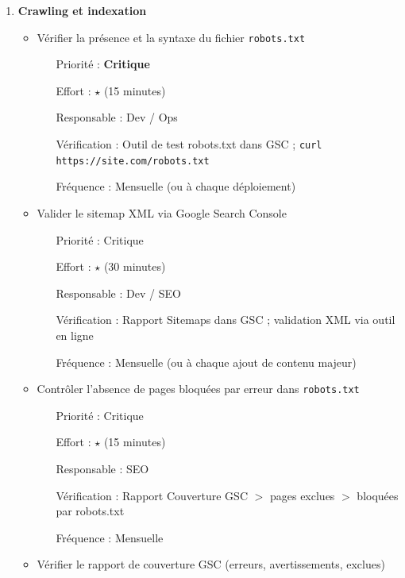 \documentclass[12pt,a4paper,twoside]{report}
\newcommand{\important}[1]{\textbf{\textcolor{googlered}{#1}}}
\begin{document}
\begin{enumerate}
    \item \textbf{Crawling et indexation}
    \begin{itemize}
        \item Vérifier la présence et la syntaxe du fichier \texttt{robots.txt}
        \begin{itemize}
            \item[Priorité :] \important{Critique}
            \item[Effort :] $\star$ (15 minutes)
            \item[Responsable :] Dev / Ops
            \item[Vérification :] Outil de test robots.txt dans GSC ; \texttt{curl https://site.com/robots.txt}
            \item[Fréquence :] Mensuelle (ou à chaque déploiement)
        \end{itemize}
        \item Valider le sitemap XML via Google Search Console
        \begin{itemize}
            \item[Priorité :] Critique
            \item[Effort :] $\star$ (30 minutes)
            \item[Responsable :] Dev / SEO
            \item[Vérification :] Rapport Sitemaps dans GSC ; validation XML via outil en ligne
            \item[Fréquence :] Mensuelle (ou à chaque ajout de contenu majeur)
        \end{itemize}
        \item Contrôler l'absence de pages bloquées par erreur dans \texttt{robots.txt}
        \begin{itemize}
            \item[Priorité :] Critique
            \item[Effort :] $\star$ (15 minutes)
            \item[Responsable :] SEO
            \item[Vérification :] Rapport Couverture GSC $>$ pages exclues $>$ bloquées par robots.txt
            \item[Fréquence :] Mensuelle
        \end{itemize}
        \item Vérifier le rapport de couverture GSC (erreurs, avertissements, exclues)
        \begin{itemize}

\end{itemize}
\end{itemize}
\end{enumerate}
\end{document}
